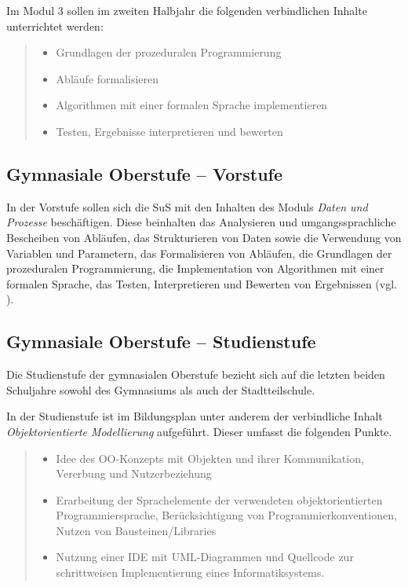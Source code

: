 \documentclass[paper=a4, DIV=calc, BCOR=12mm, twoside=on, onecolumn=on, open = right, titlepage =on, parskip =half-, headsepline = on, footsepline = off, chapterprefix = off, appendixprefix = on, fontsize = 12pt, numbers = noenddot, abstract = on]{scrbook}
\begin{document}
Im Modul 3 sollen im zweiten Halbjahr die folgenden verbindlichen Inhalte unterrichtet werden:
\begin{quote}
\begin{itemize}
\item Grundlagen der prozeduralen Programmierung
\item Abläufe formalisieren
\item Algorithmen mit einer formalen Sprache implementieren
\item Testen, Ergebnisse interpretieren und bewerten \hfill \cite{stsmittel:14}
\end{itemize}
\end{quote}


\vspace*{-1ex}
\subsection{Gymnasiale Oberstufe -- Vorstufe}

In der Vorstufe sollen sich die SuS mit den Inhalten des Moduls \emph{Daten und Prozesse} beschäftigen. Diese beinhalten das Analysieren und umgangssprachliche Bescheiben von Abläufen, das Strukturieren von Daten sowie die Verwendung von Variablen und Parametern, das Formalisieren von Abläufen, die Grundlagen der prozeduralen Programmierung, die Implementation von Algorithmen mit einer formalen Sprache, das Testen, Interpretieren und Bewerten von Ergebnissen (vgl. \cite{oberstufe:09}). 
\vspace*{-1ex}
\subsection{Gymnasiale Oberstufe -- Studienstufe}
Die Studienstufe der gymnasialen Oberstufe bezieht sich auf die letzten beiden Schuljahre sowohl des Gymnasiums als auch der Stadtteilschule.

In der Studienstufe ist im Bildungsplan unter anderem der verbindliche Inhalt \emph{Objektorientierte Modellierung} aufgeführt. Dieser umfasst die folgenden Punkte.
\begin{quote}
\begin{itemize}
\item Idee des OO-Konzepts mit Objekten und ihrer Kommunikation, Vererbung und Nutzerbeziehung
\item Erarbeitung der Sprachelemente der verwendeten objektorientierten Programmiersprache, Berücksichtigung von Programmierkonventionen, Nutzen von Bausteinen/Libraries
\item Nutzung einer IDE mit UML-Diagrammen und Quellcode zur schrittweisen Implementierung eines Informatiksystems. \hfill \cite{oberstufe:09}
\end{itemize}
\end{quote}
\end{document}
